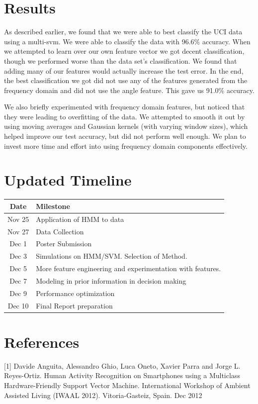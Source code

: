 \documentclass{article} %
\begin{document}
\section{Results}
As described earlier, we found that we were able to best classify the UCI data using a multi-svm. We were able to classify the data with 96.6\% accuracy.
When we attempted to learn over our own feature vector we got decent classification, though we performed worse than the data set’s classification. We found that adding many of our features would actually increase the test error. In the end, the best classification we got did not use any of the features generated from the frequency domain and did not use the angle feature. This gave us 91.0\% accuracy.

We also briefly experimented with frequency domain features, but noticed that they were leading to overfitting of the data. We attempted to smooth it out by using moving averages and Gaussian kernels (with varying window sizes), which helped improve our test accuracy, but did not perform well enough. We plan to invest more time and effort into using frequency domain components effectively.

\section{Updated Timeline}
\begin{tabular}{ |c | l | }
\hline
Date & Milestone \\
\hline
Nov 25 & Application of HMM to data \\
Nov 27 & Data Collection \\
Dec 1 & Poster Submission \\
Dec 3 & Simulations on HMM/SVM. Selection of Method. \\
Dec 5 & More feature engineering and experimentation with features. \\
Dec 7 & Modeling in prior information in decision making \\
Dec 9 & Performance optimization \\
Dec 10 & Final Report preparation \\
\hline
\end{tabular}


\section*{References}
[1] Davide Anguita, Alessandro Ghio, Luca Oneto, Xavier Parra and Jorge L. Reyes-Ortiz. Human Activity Recognition on Smartphones using a Multiclass Hardware-Friendly Support Vector Machine. International Workshop of Ambient Assisted Living (IWAAL 2012). Vitoria-Gasteiz, Spain. Dec 2012
\end{document}
